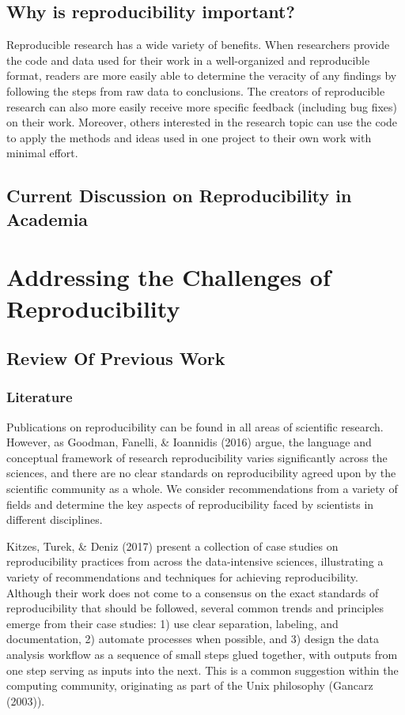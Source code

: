 \documentclass[12pt,twoside]{reedthesis}
\begin{document}
\section{Why is reproducibility
important?}\label{why-is-reproducibility-important}

Reproducible research has a wide variety of benefits. When researchers
provide the code and data used for their work in a well-organized and
reproducible format, readers are more easily able to determine the
veracity of any findings by following the steps from raw data to
conclusions. The creators of reproducible research can also more easily
receive more specific feedback (including bug fixes) on their work.
Moreover, others interested in the research topic can use the code to
apply the methods and ideas used in one project to their own work with
minimal effort.

\section{Current Discussion on Reproducibility in
Academia}\label{current-discussion-on-reproducibility-in-academia}

\chapter{Addressing the Challenges of
Reproducibility}\label{my-solution}

\section{Review Of Previous Work}\label{review-of-previous-work}

\subsection{Literature}\label{literature}

Publications on reproducibility can be found in all areas of scientific
research. However, as Goodman, Fanelli, \& Ioannidis (2016) argue, the
language and conceptual framework of research reproducibility varies
significantly across the sciences, and there are no clear standards on
reproducibility agreed upon by the scientific community as a whole. We
consider recommendations from a variety of fields and determine the key
aspects of reproducibility faced by scientists in different disciplines.

Kitzes, Turek, \& Deniz (2017) present a collection of case studies on
reproducibility practices from across the data-intensive sciences,
illustrating a variety of recommendations and techniques for achieving
reproducibility. Although their work does not come to a consensus on the
exact standards of reproducibility that should be followed, several
common trends and principles emerge from their case studies: 1) use
clear separation, labeling, and documentation, 2) automate processes
when possible, and 3) design the data analysis workflow as a sequence of
small steps glued together, with outputs from one step serving as inputs
into the next. This is a common suggestion within the computing
community, originating as part of the Unix philosophy (Gancarz (2003)).
\end{document}
